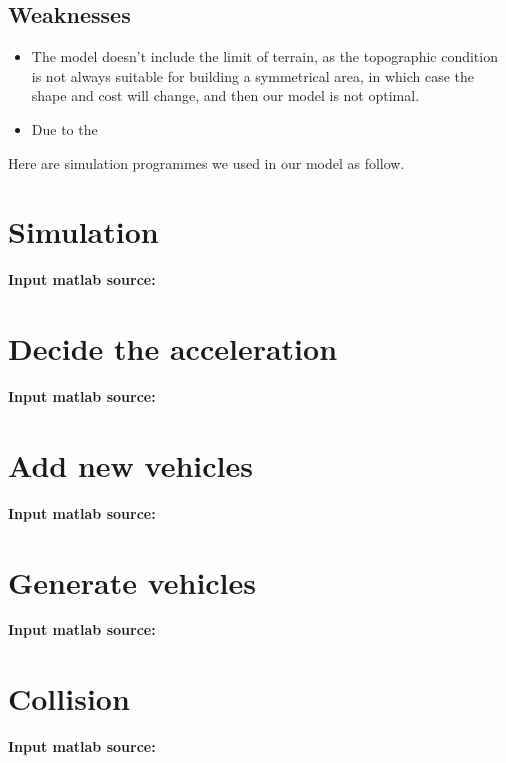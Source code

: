 \documentclass{mcmthesis}
\begin{document}
\subsection{Weaknesses}
\begin{itemize}
\item The model doesn't include the limit of terrain, as the topographic condition is not always suitable for building a symmetrical area, in which case the shape and cost will change, and then our model is not optimal.
\item Due to the 




\end{itemize}
\begin{appendices}
	Here are simulation programmes we used in our model as follow.\\
\section{Simulation}
\textbf{\textcolor[rgb]{0.98,0.00,0.00}{Input matlab source:}}


\section{Decide the acceleration}
\textbf{\textcolor[rgb]{0.98,0.00,0.00}{Input matlab source:}}


\section{Add new vehicles}
\textbf{\textcolor[rgb]{0.98,0.00,0.00}{Input matlab source:}}


\section{Generate vehicles}
\textbf{\textcolor[rgb]{0.98,0.00,0.00}{Input matlab source:}}


\section{Collision}
\textbf{\textcolor[rgb]{0.98,0.00,0.00}{Input matlab source:}}



\end{appendices}
\end{document}
